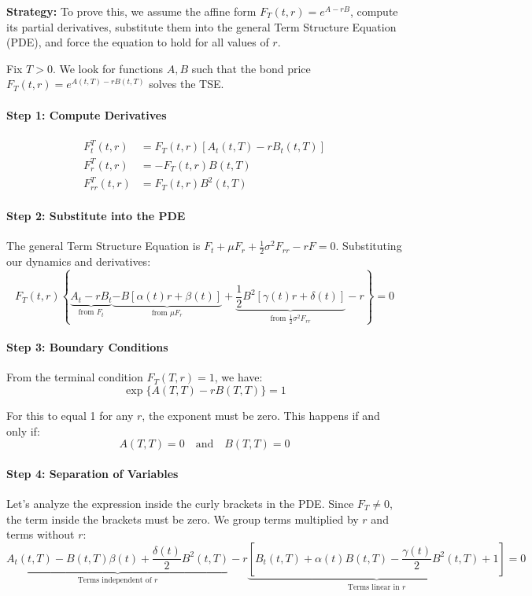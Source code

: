 \documentclass[12pt,a4paper]{article}
\theoremstyle{definition}
\begin{document}
\textbf{Strategy:} To prove this, we assume the affine form $F_T(t,r) = e^{A - rB}$, compute its partial derivatives, substitute them into the general Term Structure Equation (PDE), and force the equation to hold for all values of $r$.

Fix $T > 0$. We look for functions $A,B$ such that the bond price $F_T(t,r) = e^{A(t,T) - rB(t,T)}$ solves the TSE.

\paragraph{Step 1: Compute Derivatives}
\[
\begin{aligned}
F_t^T(t,r) &= F_T(t,r)[A_t(t,T) - rB_t(t,T)] \\
F_r^T(t,r) &= -F_T(t,r)B(t,T) \\
F_{rr}^T(t,r) &= F_T(t,r)B^2(t,T)
\end{aligned}
\]

\paragraph{Step 2: Substitute into the PDE} 

The general Term Structure Equation is $F_t + \mu F_r + \frac{1}{2}\sigma^2 F_{rr} - rF = 0$. Substituting our dynamics and derivatives:
\[
F_T(t,r)\left\{\underbrace{A_t - rB_t}_{\text{from } F_t} \underbrace{- B[\alpha(t)r + \beta(t)]}_{\text{from } \mu F_r} + \underbrace{\frac{1}{2}B^2[\gamma(t)r + \delta(t)]}_{\text{from } \frac{1}{2}\sigma^2 F_{rr}} - r\right\} = 0
\]

\paragraph{Step 3: Boundary Conditions} 

From the terminal condition $F_T(T,r) = 1$, we have:
\[
\exp\{A(T,T) - rB(T,T)\} = 1
\]

For this to equal 1 for any $r$, the exponent must be zero. This happens if and only if:
\[
A(T,T) = 0 \quad \text{and} \quad B(T,T) = 0
\]

\paragraph{Step 4: Separation of Variables} 

Let's analyze the expression inside the curly brackets in the PDE. Since $F_T \neq 0$, the term inside the brackets must be zero. We group terms multiplied by $r$ and terms without $r$:
\[
\underbrace{A_t(t,T) - B(t,T)\beta(t) + \frac{\delta(t)}{2}B^2(t,T)}_{\text{Terms independent of } r} - r\underbrace{[B_t(t,T) + \alpha(t)B(t,T) - \frac{\gamma(t)}{2}B^2(t,T) + 1]}_{\text{Terms linear in } r} = 0
\]
\end{document}
